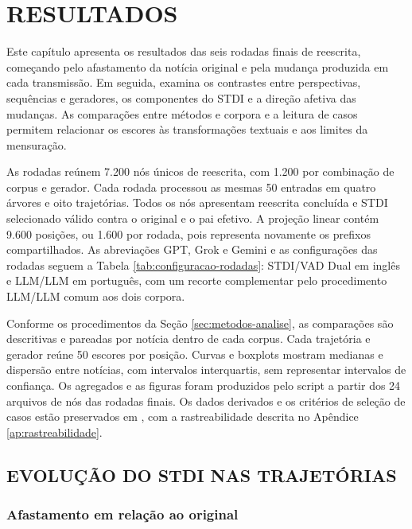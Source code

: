 \chapter{RESULTADOS}
\label{ch:resultados}


Este capítulo apresenta os resultados das seis rodadas finais de reescrita, começando pelo afastamento da notícia original e pela mudança produzida em cada transmissão. Em seguida, examina os contrastes entre perspectivas, sequências e geradores, os componentes do STDI e a direção afetiva das mudanças. As comparações entre métodos e corpora e a leitura de casos permitem relacionar os escores às transformações textuais e aos limites da mensuração.

As rodadas reúnem 7.200 nós únicos de reescrita, com 1.200 por combinação de corpus e gerador. Cada rodada processou as mesmas 50 entradas em quatro árvores e oito trajetórias. Todos os nós apresentam reescrita concluída e STDI selecionado válido contra o original e o pai efetivo. A projeção linear contém 9.600 posições, ou 1.600 por rodada, pois representa novamente os prefixos compartilhados. As abreviações GPT, Grok e Gemini e as configurações das rodadas seguem a Tabela \ref{tab:configuracao-rodadas}: STDI/VAD Dual em inglês e LLM/LLM em português, com um recorte complementar pelo procedimento LLM/LLM comum aos dois corpora.

Conforme os procedimentos da Seção \ref{sec:metodos-analise}, as comparações são descritivas e pareadas por notícia dentro de cada corpus. Cada trajetória e gerador reúne 50 escores por posição. Curvas e boxplots mostram medianas e dispersão entre notícias, com intervalos interquartis, sem representar intervalos de confiança. Os agregados e as figuras foram produzidos pelo script  a partir dos 24 arquivos de nós das rodadas finais. Os dados derivados e os critérios de seleção de casos estão preservados em , com a rastreabilidade descrita no Apêndice \ref{ap:rastreabilidade}.

\section{EVOLUÇÃO DO STDI NAS TRAJETÓRIAS}
\label{sec:resultados-trajetorias}

\subsection{Afastamento em relação ao original}

